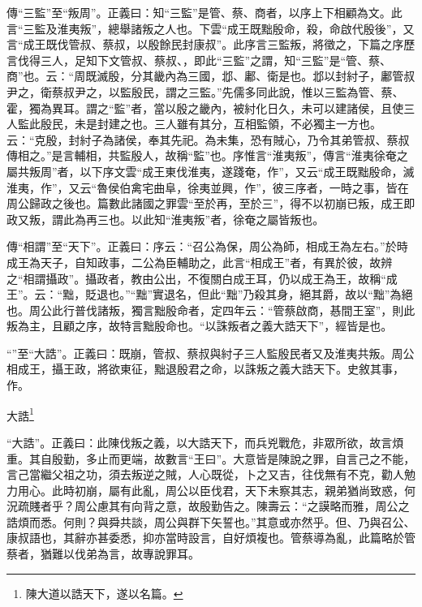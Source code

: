 {\noindent\zhuan{}\fzbyks 傳“三監”至“叛周”。正義曰：知“三監”是管、蔡、商者，以序上下相顧為文。此言“三監及淮夷叛”，總舉諸叛之人也。下雲“成王既黜殷命，殺，命啟代殷後”，又言“成王既伐管叔、蔡叔，以殷餘民封康叔”。此序言三監叛，將徵之，下篇之序歷言伐得三人，足知下文管叔、蔡叔、，即此“三監”之謂，知“三監”是“管、蔡、商”也。云：“周既滅殷，分其畿內為三國，邶、鄘、衛是也。邶以封紂子，鄘管叔尹之，衛蔡叔尹之，以監殷民，謂之三監。”先儒多同此說，惟以三監為管、蔡、霍，獨為異耳。謂之“監”者，當以殷之畿內，被紂化日久，未可以建諸侯，且使三人監此殷民，未是封建之也。三人雖有其分，互相監領，不必獨主一方也。云：“克殷，封紂子為諸侯，奉其先祀。為未集，恐有賊心，乃令其弟管叔、蔡叔傳相之。”是言輔相，共監殷人，故稱“監”也。序惟言“淮夷叛”，傳言“淮夷徐奄之屬共叛周”者，以下序文雲“成王東伐淮夷，遂踐奄，作”，又云“成王既黜殷命，滅淮夷，作”，又云“魯侯伯禽宅曲阜，徐夷並興，作”，彼三序者，一時之事，皆在周公歸政之後也。篇數此諸國之罪雲“至於再，至於三”，得不以初崩已叛，成王即政又叛，謂此為再三也。以此知“淮夷叛”者，徐奄之屬皆叛也。 \par}

{\noindent\zhuan{}\fzbyks 傳“相謂”至“天下”。正義曰：序云：“召公為保，周公為師，相成王為左右。”於時成王為天子，自知政事，二公為臣輔助之，此言“相成王”者，有異於彼，故辨之“相謂攝政”。攝政者，教由公出，不復關白成王耳，仍以成王為王，故稱“成王”。云：“黜，貶退也。”“黜”實退名，但此“黜”乃殺其身，絕其爵，故以“黜”為絕也。周公此行普伐諸叛，獨言黜殷命者，定四年云：“管蔡啟商，惎間王室”，則此叛為主，且顧之序，故特言黜殷命也。“以誅叛者之義大誥天下”，經皆是也。 \par}

{\noindent\shu{}\fzkt “”至“大誥”。正義曰：既崩，管叔、蔡叔與紂子三人監殷民者又及淮夷共叛。周公相成王，攝王政，將欲東征，黜退殷君之命，以誅叛之義大誥天下。史敘其事，作。 \par}

大誥\footnote{陳大道以誥天下，遂以名篇。}

{\noindent\shu{}\fzkt “大誥”。正義曰：此陳伐叛之義，以大誥天下，而兵兇戰危，非眾所欲，故言煩重。其自殷勤，多止而更端，故數言“王曰”。大意皆是陳說之罪，自言己之不能，言己當繼父祖之功，須去叛逆之賊，人心既從，卜之又吉，往伐無有不克，勸人勉力用心。此時初崩，屬有此亂，周公以臣伐君，天下未察其志，親弟猶尚致惑，何況疏賤者乎？周公慮其有向背之意，故殷勤告之。陳壽云：“之謨略而雅，周公之誥煩而悉。何則？與舜共談，周公與群下矢誓也。”其意或亦然乎。但、乃與召公、康叔語也，其辭亦甚委悉，抑亦當時設言，自好煩複也。管蔡導為亂，此篇略於管蔡者，猶難以伐弟為言，故專說罪耳。 \par}

